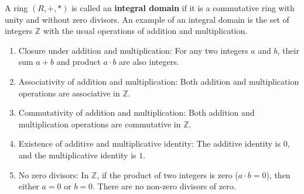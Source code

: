 \begin{definition}
    
A ring \((R,+,*)\) is called an \textbf{integral domain }if it is a commutative ring with unity and without zero divisors.
An example of an integral domain is the set of integers \(\mathbb{Z}\) with the usual operations of addition and multiplication.

\begin{enumerate}
    \item Closure under addition and multiplication: For any two integers \(a\) and \(b\), their sum \(a + b\) and product \(a \cdot b\) are also integers.
    \item Associativity of addition and multiplication: Both addition and multiplication operations are associative in \(\mathbb{Z}\).
    \item Commutativity of addition and multiplication: Both addition and multiplication operations are commutative in \(\mathbb{Z}\).
    \item Existence of additive and multiplicative identity: The additive identity is \(0\), and the multiplicative identity is \(1\).
    \item No zero divisors: In \(\mathbb{Z}\), if the product of two integers is zero (\(a \cdot b = 0\)), then either \(a = 0\) or \(b = 0\). There are no non-zero divisors of zero.
\end{enumerate}
\end{definition}

